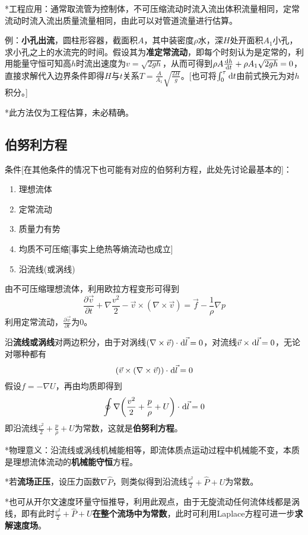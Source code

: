 \documentclass[a4paper,UTF8,fontset=windows]{ctexart}
\newcommand*{\dr}{\hspace{0.07em}\mathrm{d}}
\begin{document}
*工程应用：通常取流管为控制体，不可压缩流动时流入流出体积流量相同，定常流动时流入流出质量流量相同，由此可以对管道流量进行估算。

例：\textbf{小孔出流}，圆柱形容器，截面积$A$，其中装密度$\rho$水，深$H$处开面积$A_1$小孔，求小孔之上的水流完的时间。假设其为\textbf{准定常流动}，即每个时刻认为是定常的，利用能量守恒可知高$h$时流出速度为$v=\sqrt{2gh}$，从而可得到$\rho A\frac{\dr h}{\dr t}+\rho A_1\sqrt{2gh}=0$，直接求解代入边界条件即得$H$与$t$关系$T=\frac{A}{A_1}\sqrt{\frac{2H}{g}}$。[也可将$\int_0^\tau\dr t$由前式换元为对$h$积分。]

*此方法仅为工程估算，未必精确。

\subsection{伯努利方程}
条件[在其他条件的情况下也可能有对应的伯努利方程，此处先讨论最基本的]：
\begin{enumerate}
    \item 理想流体
    \item 定常流动
    \item 质量力有势
    \item 均质不可压缩[事实上绝热等熵流动也成立]
    \item 沿流线(或涡线)
\end{enumerate}

由不可压缩理想流体，利用欧拉方程变形可得到
$$\frac{\partial\vec{v}}{\partial t}+\nabla\frac{v^2}{2}-\vec{v}\times(\nabla\times\vec{v})=\vec{f}-\frac{1}{\rho}\nabla p$$
利用定常流动，$\frac{\partial\vec{v}}{\partial t}$为0。

沿\textbf{流线或涡线}对两边积分，由于对涡线$(\nabla\times\vec{v})\cdot\dr\vec{l}=0$，对流线$\vec{v}\times\dr\vec{l}=0$，无论对哪种都有
$$(\vec{v}\times(\nabla\times\vec{v}))\cdot\dr\vec{l}=0$$
假设$f=-\nabla U$，再由均质即得到
$$\oint\nabla\bigg(\frac{v^2}{2}+\frac{p}{\rho}+U\bigg)\cdot\dr\vec{l}=0$$
即沿流线$\frac{v^2}{2}+\frac{p}{\rho}+U$为常数，这就是\textbf{伯努利方程}。

*物理意义：沿流线或涡线机械能相等，即流体质点运动过程中机械能不变，本质是理想流体流动的\textbf{机械能守恒}方程。

*若\textbf{流场正压}，设压力函数$\nabla\hat{P}$，则类似得到沿流线$\frac{v^2}{2}+\hat{P}+U$为常数。

*也可从开尔文速度环量守恒推导，利用此观点，由于无旋流动任何流体线都是涡线，即有此时$\frac{v^2}{2}+\hat{P}+U$\textbf{在整个流场中为常数}，此时可利用Laplace方程可进一步\textbf{求解速度场}。
\end{document}
